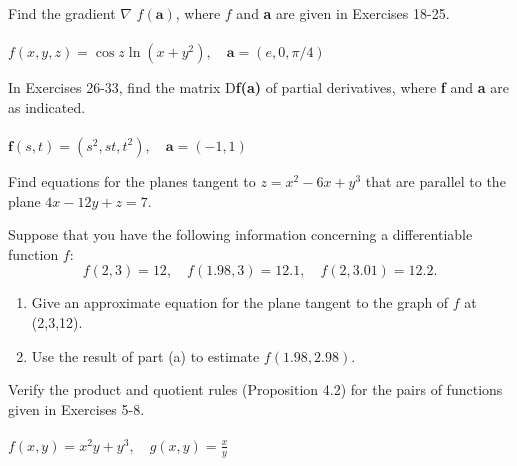 \documentclass[12pt,letterpaper]{hmcpset}
\begin{document}

\begin{problem}[2.3.24]
    Find the gradient $\nabla$ $f(\textbf{a})$, where $f$ and
    \textbf{a} are given in Exercises 18-25.\\\\
    $f(x,y,z)=\cos z\ln(x+y^2),\quad \textbf{a}=(e,0,\pi/4)$
\end{problem}
\begin{solution}
    \vfill
\end{solution}
\newpage

\begin{problem}[2.3.33]
    In Exercises 26-33, find the matrix D\textbf{f(a)} of partial
    derivatives, where \textbf{f} and \textbf{a} are as indicated.\\\\
    $\textbf{f}(s,t)=(s^2,st,t^2),\quad \textbf{a}=(−1,1)$
\end{problem}
\begin{solution}
    \vfill
\end{solution}
\newpage

\begin{problem}[2.3.40]
    Find equations for the planes tangent to $z=x^2-6x+y^3$ that are parallel to
    the plane $4x-12y+z=7$.
\end{problem}
\begin{solution}
    \vfill
\end{solution}
\newpage

\begin{problem}[2.3.42]
    Suppose that you have the following information concerning a
    differentiable function $f$:
    $$f(2,3)=12,\quad f(1.98,3)=12.1,\quad f(2,3.01)=12.2.$$
    \begin{enumerate}
        \item Give an approximate equation for the plane tangent to the graph of
            $f$ at (2,3,12).
        \item Use the result of part (a) to estimate $f(1.98, 2.98)$.
    \end{enumerate}
\end{problem}
\begin{solution}
    \vfill
\end{solution}
\newpage

\begin{problem}[2.4.5]
    Verify the product and quotient rules (Proposition 4.2) for the
    pairs of functions given in Exercises 5-8.\\\\
    $\displaystyle f(x,y)=x^2y+y^3,\quad g(x,y)=\frac{x}{y}$
\end{problem}
\begin{solution}
    \vfill
\end{solution}
\newpage
\end{document}
